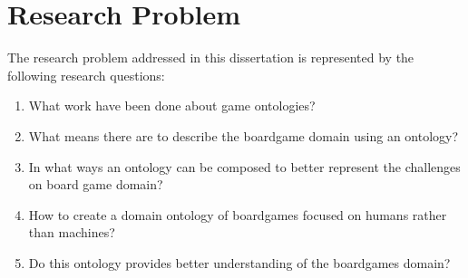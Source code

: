 \section{Research Problem}

The research problem addressed in this dissertation is represented by the following research questions:
\begin{enumerate}
    \item {What work have been done about game ontologies?}
    \item {What means there are to describe the boardgame domain using an ontology?}
    \item {In what ways an ontology can be composed to better represent the challenges on board game domain?}
    \item {How to create a domain ontology of boardgames focused on humans rather than machines?}
    \item{Do this ontology provides better understanding of the boardgames domain?}
\end{enumerate}